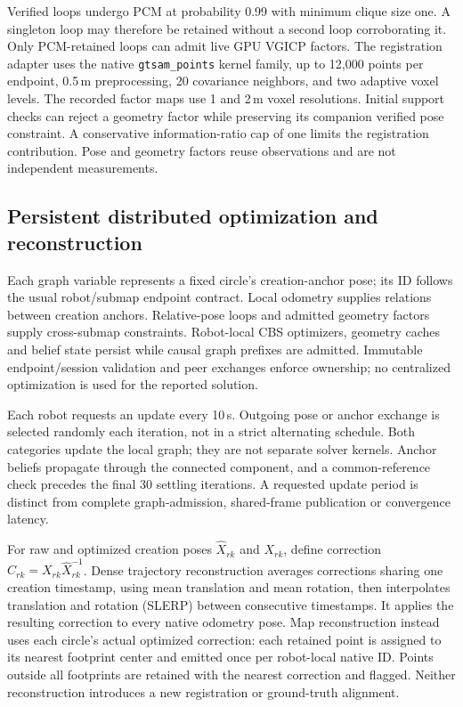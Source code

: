 Verified loops undergo PCM at probability 0.99 with minimum clique size one. A singleton loop may therefore be retained without a second loop corroborating it. Only PCM-retained loops can admit live GPU VGICP factors. The registration adapter uses the native \texttt{gtsam\_points} kernel family, up to 12,000 points per endpoint, 0.5\,m preprocessing, 20 covariance neighbors, and two adaptive voxel levels. The recorded factor maps use 1 and 2\,m voxel resolutions. Initial support checks can reject a geometry factor while preserving its companion verified pose constraint. A conservative information-ratio cap of one limits the registration contribution. Pose and geometry factors reuse observations and are not independent measurements.

\subsection{Persistent distributed optimization and reconstruction}
Each graph variable represents a fixed circle's creation-anchor pose; its ID follows the usual robot/submap endpoint contract. Local odometry supplies relations between creation anchors. Relative-pose loops and admitted geometry factors supply cross-submap constraints. Robot-local CBS optimizers, geometry caches and belief state persist while causal graph prefixes are admitted. Immutable endpoint/session validation and peer exchanges enforce ownership; no centralized optimization is used for the reported solution.

Each robot requests an update every 10\,s. Outgoing pose or anchor exchange is selected randomly each iteration, not in a strict alternating schedule. Both categories update the local graph; they are not separate solver kernels. Anchor beliefs propagate through the connected component, and a common-reference check precedes the final 30 settling iterations. A requested update period is distinct from complete graph-admission, shared-frame publication or convergence latency.

For raw and optimized creation poses $\widehat{X}_{rk}$ and $X_{rk}$, define correction $C_{rk}=X_{rk}\widehat{X}_{rk}^{-1}$. Dense trajectory reconstruction averages corrections sharing one creation timestamp, using mean translation and mean rotation, then interpolates translation and rotation (SLERP) between consecutive timestamps. It applies the resulting correction to every native odometry pose. Map reconstruction instead uses each circle's actual optimized correction: each retained point is assigned to its nearest footprint center and emitted once per robot-local native ID. Points outside all footprints are retained with the nearest correction and flagged. Neither reconstruction introduces a new registration or ground-truth alignment.
